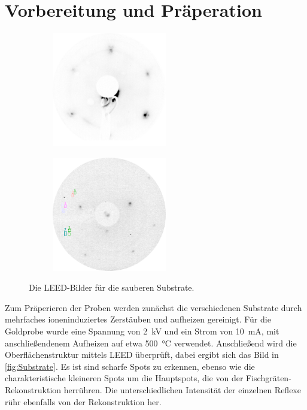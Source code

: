     \section{Vorbereitung und Präperation}
        \label{sec:Praep}
            \begin{figure}
                \centering
                \begin{subfigure}{0.48\textwidth}
                    \centering
                    \includegraphics[height=5cm]{./content/pictures/2021_06_08_002_Au(111)_75eV}
                    \label{fig:LEED_Au}
                \end{subfigure}
                \begin{subfigure}{0.48\textwidth}
                    \centering
                    \includegraphics[height=5cm]{./content/pictures/FeO/2021_09_07_002_passivatedFe(100)_125eV.png}
                    \label{fig:LEED_pFe}
                \end{subfigure}
                \caption{Die LEED-Bilder für die sauberen Substrate.}
            \label{fig:Substrate}
            \end{figure}
            Zum Präperieren der Proben werden zunächst die verschiedenen Substrate durch mehrfaches ioneninduziertes Zerstäuben und aufheizen gereinigt.
            Für die Goldprobe wurde eine Spannung von \SI{2}{\kilo\volt} und ein Strom von \SI{10}{\milli\ampere}, mit anschließendenem Aufheizen auf etwa \SI{500}{\celsius} verwendet.
            Anschließend wird die Oberflächenstruktur mittels LEED überprüft, dabei ergibt sich das Bild in \autoref{fig:Substrate}.
            Es ist sind scharfe Spots zu erkennen, ebenso wie die charakteristische kleineren Spots um die Hauptspots, die von der Fischgräten-Rekonstruktion herrühren.
            Die unterschiedlichen Intensität der einzelnen Reflexe rühr ebenfalls von der Rekonstruktion her.

